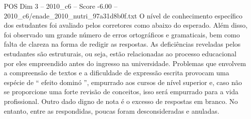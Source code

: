 \begin{textsample}{POS Dim 3 – 2010\_c6 – Score -6.00 – 2010\_c6/enade\_2010\_nutri\_97a31d8b0f.txt}
O nível de conhecimento específico dos estudantes foi avaliado pelos corretores como abaixo do esperado.
Além disso, foi observado um grande número de erros ortográficos e gramaticais, bem como falta de clareza na forma de redigir as respostas.
As deficiências reveladas pelos estudantes são estruturais, ou seja, estão relacionadas ao processo educacional por eles empreendido antes do ingresso na universidade.
Problemas que envolvem a compreensão de textos e a dificuldade de expressão escrita provocam uma espécie de “ efeito dominó ”, empurrado aos cursos de nível superior e, caso não se proporcione uma forte revisão de conceitos, isso será empurrado para a vida profissional.
Outro dado digno de nota é o excesso de respostas em branco.
No entanto, entre as respondidas, poucas foram desconsideradas e anuladas.

\end{textsample}
